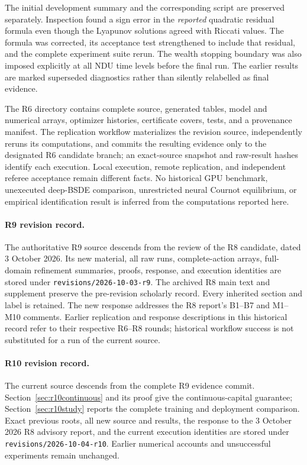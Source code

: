\begin{appendix}
The initial development summary and the corresponding script are preserved separately. Inspection found a sign error in the \emph{reported} quadratic residual formula even though the Lyapunov solutions agreed with Riccati values. The formula was corrected, its acceptance test strengthened to include that residual, and the complete experiment suite rerun. The wealth stopping boundary was also imposed explicitly at all NDU time levels before the final run. The earlier results are marked superseded diagnostics rather than silently relabelled as final evidence.

The R6 directory contains complete source, generated tables, model and numerical arrays, optimizer histories, certificate covers, tests, and a provenance manifest. The replication workflow materializes the revision source, independently reruns its computations, and commits the resulting evidence only to the designated R6 candidate branch; an exact-source snapshot and raw-result hashes identify each execution. Local execution, remote replication, and independent referee acceptance remain different facts. No historical GPU benchmark, unexecuted deep-BSDE comparison, unrestricted neural Cournot equilibrium, or empirical identification result is inferred from the computations reported here.
\end{appendix}
\paragraph{R9 revision record.} The authoritative R9 source descends from the review of the R8 candidate, dated 3 October 2026. Its new material, all raw runs, complete-action arrays, full-domain refinement summaries, proofs, response, and execution identities are stored under \texttt{revisions/2026-10-03-r9}. The archived R8 main text and supplement preserve the pre-revision scholarly record. Every inherited section and label is retained. The new response addresses the R8 report's B1--B7 and M1--M10 comments. Earlier replication and response descriptions in this historical record refer to their respective R6--R8 rounds; historical workflow success is not substituted for a run of the current source.


\paragraph{R10 revision record.} The current source descends from the complete R9 evidence commit. Section~\ref{sec:r10continuous} and its proof give the continuous-capital guarantee; Section~\ref{sec:r10study} reports the complete training and deployment comparison. Exact previous roots, all new source and results, the response to the 3 October 2026 R8 advisory report, and the current execution identities are stored under \texttt{revisions/2026-10-04-r10}. Earlier numerical accounts and unsuccessful experiments remain unchanged.
